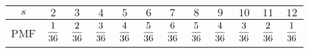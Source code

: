 \documentclass[a4paper, 12pt]{article}
\newcommand{\fract}[2]{\dfrac{\mathstrut #1}{\mathstrut #2}}
\begin{document}
\begin{enumerate}
{              \begin{center}
                  \begin{tabular}{|c|c|c|c|c|c|c|c|c|c|c|c|}
                      \hline
                      $s$ & $2$             & $3$             & $4$             & $5$             & $6$             & $7$             & $8$             & $9$             & $10$            & $11$            & $12$            \\
                      \hline
                      PMF & $\fract{1}{36}$ & $\fract{2}{36}$ & $\fract{3}{36}$ & $\fract{4}{36}$ & $\fract{5}{36}$ & $\fract{6}{36}$ & $\fract{5}{36}$ & $\fract{4}{36}$ & $\fract{3}{36}$ & $\fract{2}{36}$ & $\fract{1}{36}$ \\
                      \hline
                  \end{tabular}
              \end{center}

}
\end{enumerate}
\end{document}
